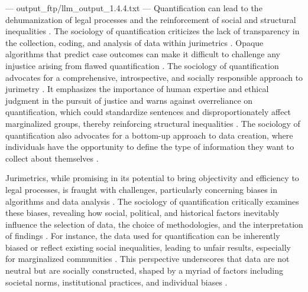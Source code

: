 ---
output_ftp/llm_output_1.4.4.txt
---
Quantification can lead to the dehumanization of legal processes and the reinforcement of social and structural inequalities \cite{10.1590/data.2022.65.3.267,10.1007/978-3-319-44000-2_15,10.5040/9781350220645,10.1080/07329113.2015.1046739,de2010jurimetrics}. The sociology of quantification criticizes the lack of transparency in the collection, coding, and analysis of data within jurimetrics \cite{10.1590/data.2022.65.3.267,10.1007/978-3-319-44000-2_15,10.5040/9781350220645,10.3390/fi9040068,10.1057/s41599-020-0396-5,unger2021process}. Opaque algorithms that predict case outcomes can make it difficult to challenge any injustice arising from flawed quantification \cite{10.1590/data.2022.65.3.267,10.1007/978-3-319-44000-2_15,10.5040/9781350220645,10.3390/fi9040068,10.1057/s41599-020-0396-5,unger2021process}. The sociology of quantification advocates for a comprehensive, introspective, and socially responsible approach to jurimetry \cite{10.1590/data.2022.65.3.267,10.1007/978-3-319-44000-2_15,10.5040/9781350220645,10.1080/07329113.2015.1046739,nunes2016jurimetrics}. It emphasizes the importance of human expertise and ethical judgment in the pursuit of justice and warns against overreliance on quantification, which could standardize sentences and disproportionately affect marginalized groups, thereby reinforcing structural inequalities \cite{10.1590/data.2022.65.3.267,10.1057/s41599-020-00557-0}. The sociology of quantification also advocates for a bottom-up approach to data creation, where individuals have the opportunity to define the type of information they want to collect about themselves \cite{10.1590/data.2022.65.3.267}.

Jurimetrics, while promising in its potential to bring objectivity and efficiency to legal processes, is fraught with challenges, particularly concerning biases in algorithms and data analysis \cite{10.1590/data.2022.65.3.267,10.32586/rcda.v18i1.585}. The sociology of quantification critically examines these biases, revealing how social, political, and historical factors inevitably influence the selection of data, the choice of methodologies, and the interpretation of findings \cite{10.1590/data.2022.65.3.267,10.32586/rcda.v18i1.585}. For instance, the data used for quantification can be inherently biased or reflect existing social inequalities, leading to unfair results, especially for marginalized communities \cite{10.1590/data.2022.65.3.267,10.1057/s41599-020-00557-0}. This perspective underscores that data are not neutral but are socially constructed, shaped by a myriad of factors including societal norms, institutional practices, and individual biases \cite{10.1057/s41599-020-00557-0, salais2016quantification}.

